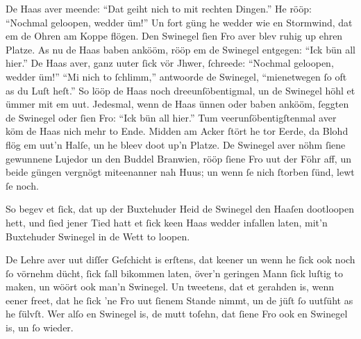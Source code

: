 De Haas aver meende:
\enquote{Dat geiht nich to mit rechten Dingen.}
He rööp:
\enquote{Nochmal geloopen, wedder üm!}
Un fort güng he wedder wie en Stormwind, dat em de Ohren am Koppe
flögen. Den Swinegel ſien Fro aver blev ruhig up ehren Platze.
As nu de Haas baben ankööm, rööp em de Swinegel entgegen:
\enquote{Ick bün all hier.}
De Haas aver, ganz uuter ſick vör Jhwer, ſchreede:
\enquote{Nochmal geloopen, wedder üm!}
\enquote{Mi nich to ſchlimm,} antwoorde de Swinegel,
\enquote{mienetwegen ſo oft  as du Luſt heſt.}
So lööp de Haas noch dreeunſöbentigmal, un de Swinegel höhl
et ümmer mit em uut. Jedesmal, wenn de Haas ünnen oder baben ankööm,
ſeggten de Swinegel oder ſien Fro:
\enquote{Ick bün all hier.}
Tum veerunſöbentigſtenmal aver köm de Haas nich mehr to Ende. Midden
am Acker ſtört he tor Eerde, da Blohd flög em uut'n Halſe, un he
bleev doot up'n Platze. De Swinegel aver nöhm ſiene gewunnene Lujedor
un den Buddel Branwien, rööp ſiene Fro uut der Föhr aff, un beide
güngen vergnögt miteenanner nah Huus; un wenn ſe nich ſtorben ſünd,
lewt ſe noch.

So begev et ſick, dat up der Buxtehuder Heid de Swinegel den Haaſen
dootloopen hett, und ſied jener Tied hatt et ſick keen Haas wedder
infallen laten, mit'n Buxtehuder Swinegel in de Wett to loopen.

De Lehre aver uut diſſer Geſchicht is erſtens, dat keener un wenn he
ſick ook noch ſo vörnehm dücht, ſick ſall bikommen laten, över'n
geringen Mann ſick luſtig to maken, un wöört ook man'n Swinegel. Un
tweetens, dat et gerahden is, wenn eener freet, dat he ſick 'ne Fro
uut ſienem Stande nimmt, un de jüſt ſo uutſüht as he ſülvſt. Wer alſo
en Swinegel is, de mutt toſehn, dat ſiene Fro ook en Swinegel is, un
ſo wieder.
